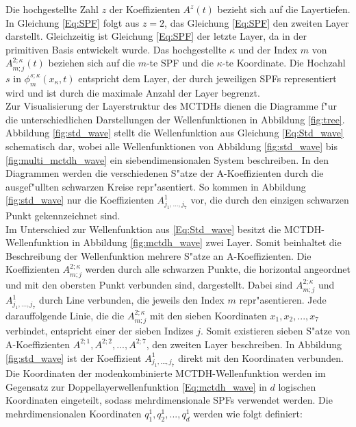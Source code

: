 Die hochgestellte Zahl $z$ der Koeffizienten $A^{z}(t)$ bezieht sich auf die Layertiefen.
In Gleichung \ref{Eq:SPF} folgt aus $z=2$, das Gleichung \ref{Eq:SPF} den zweiten Layer darstellt.
Gleichzeitig ist Gleichung \ref{Eq:SPF} der letzte Layer, da in der primitiven Basis entwickelt wurde.
Das hochgestellte $\kappa$ und der Index $m$ von $A^{2;\kappa}_{m;j}(t)$ beziehen sich auf die $m$-te SPF und die $\kappa$-te Koordinate.
Die Hochzahl $s$ in $ \phi^{s;\kappa}_{m} (x_{\kappa}, t) $ entspricht dem Layer, der durch jeweiligen SPFs representiert wird
und ist durch die maximale Anzahl der Layer begrenzt.
  \\Zur Visualisierung der Layerstruktur des MCTDHs dienen die Diagramme f"ur die unterschiedlichen Darstellungen der Wellenfunktionen in Abbildung \ref{fig:tree}.
Abbildung \ref{fig:std_wave} stellt die Wellenfunktion aus Gleichung \ref{Eq:Std_wave} schematisch dar, wobei alle Wellenfunktionen von Abbildung \ref{fig:std_wave}
bis \ref{fig:multi_mctdh_wave} ein siebendimensionalen System beschreiben.
In den Diagrammen werden die verschiedenen S"atze der A-Koeffizienten durch die ausgef"ullten schwarzen Kreise repr"asentiert.
So kommen in Abbildung \ref{fig:std_wave} nur die Koeffizienten $A^{1}_{j_{1}, ..., j_{7}}$ vor, die durch den
einzigen schwarzen Punkt gekennzeichnet sind.
  \\Im Unterschied zur Wellenfunktion aus \ref{Eq:Std_wave} besitzt die MCTDH-Wellenfunktion
in Abbildung \ref{fig:mctdh_wave} zwei Layer.
Somit beinhaltet die Beschreibung der Wellenfunktion mehrere S"atze an A-Koeffizienten.
Die Koeffizienten $A^{2;\kappa}_{m;j}$ werden durch alle schwarzen Punkte, die horizontal angeordnet und mit den obersten Punkt verbunden sind, dargestellt.
Dabei sind $A^{2;\kappa}_{m;j}$ und $A^{1}_{j_{1}, ..., j_{7}}$ durch Line verbunden, die jeweils den Index $m$ repr"asentieren.
Jede darauffolgende Linie, die die $A^{2;\kappa}_{m;j}$ mit den sieben Koordinaten $x_{1}, x_{2}, ..., x_{7}$ verbindet, entspricht einer der sieben Indizes $j$.
Somit existieren sieben S"atze von A-Koeffizienten $A^{2;1}, A^{2;2}, ..., A^{2;7}$, den zweiten Layer beschreiben.
In Abbildung \ref{fig:std_wave} ist der Koeffizient $A^{1}_{j_{1}, ..., j_{7}}$ direkt mit den Koordinaten verbunden.
  \\Die Koordinaten der modenkombinierte MCTDH-Wellenfunktion werden im Gegensatz zur Doppellayerwellenfunktion \ref{Eq:mctdh_wave}  in $d$ logischen Koordinaten
  eingeteilt, sodass mehrdimensionale SPFs verwendet werden. Die mehrdimensionalen Koordinaten $q^{1}_{1}, q^{1}_{2}, ..., q^{1}_{d}$
  werden wie folgt definiert:


